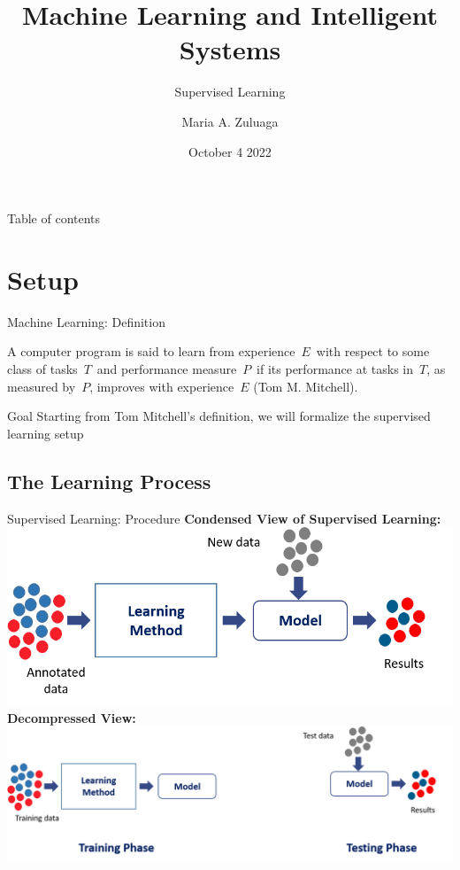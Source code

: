 \documentclass[aspectratio=169,10pt]{beamer}
\title{Machine Learning and Intelligent Systems}
\subtitle{Supervised Learning}
\author{Maria A. Zuluaga}
\institute{EURECOM - Data Science Department}
\date{October 4 2022}
\begin{document}
\maketitle
\begin{frame}{Table of contents}
	\tableofcontents
\end{frame}



\section{Setup}
\begin{frame}{Machine Learning: Definition}
	
	A computer program is said to learn from experience $E$ with respect to some class of tasks $T$ and performance measure $P$ if its performance at tasks in $T$, as measured by $P$, improves with experience $E$ (Tom M. Mitchell).
	
	\vspace{0.8cm}
	\pause
	\begin{alertblock}{Goal}
		Starting from Tom Mitchell's definition, we will formalize the supervised learning setup
	\end{alertblock}
			
\end{frame}


\subsection{The Learning Process}
\begin{frame}{Supervised Learning: Procedure}
	\centering
	 \textbf{Condensed View of Supervised Learning:}\\
	\includegraphics[width=0.5\linewidth, clip]{images/supervised}\\

	\pause
	\vspace{0.1cm}
	\textbf{Decompressed View:}\\
	\includegraphics[width=0.8\linewidth, clip]{images/train_test}\\


\end{frame}
\end{document}
